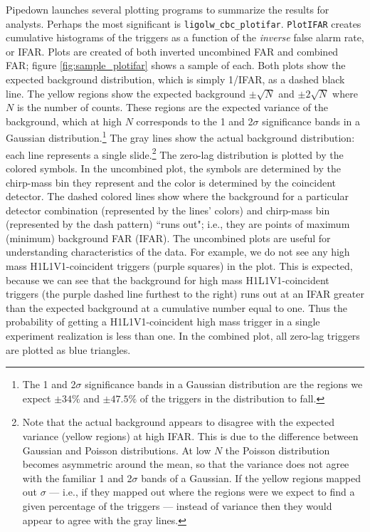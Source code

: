 Pipedown launches several plotting programs to summarize the results for
analysts. Perhaps the most significant is \verb|ligolw_cbc_plotifar|.
\texttt{PlotIFAR} creates cumulative histograms of the triggers as a function
of the \emph{inverse} false alarm rate, or IFAR. Plots are created of both
inverted uncombined \ac{FAR} and combined \ac{FAR}; figure
\ref{fig:sample_plotifar} shows a sample of each. Both plots show the expected
background distribution, which is simply 1/IFAR, as a dashed black line. The
yellow regions show the expected background $\pm \sqrt{N}$ and $\pm 2\sqrt{N}$
where $N$ is the number of counts. These regions are the expected variance of
the background, which at high $N$ corresponds to the 1 and 2$\sigma$
significance bands in a Gaussian distribution.\footnote{The 1 and 2$\sigma$
significance bands in a Gaussian distribution are the regions we expect $\pm
34\%$ and $\pm 47.5\%$ of the triggers in the distribution to fall.} The gray
lines show the actual background distribution: each line represents a single
slide.\footnote{Note that the actual background appears to disagree with the
expected variance (yellow regions) at high IFAR. This is due to the difference
between Gaussian and Poisson distributions. At low $N$ the Poisson distribution
becomes asymmetric around the mean, so that the variance does not agree with
the familiar 1 and 2$\sigma$ bands of a Gaussian. If the yellow regions mapped
out $\sigma$ --- i.e., if they mapped out where the regions were we expect to
find a given percentage of the triggers --- instead of variance then they would
appear to agree with the gray lines.} The zero-lag distribution is plotted by
the colored symbols. In the uncombined plot, the symbols are determined by the
chirp-mass bin they represent and the color is determined by the coincident
detector. The dashed colored lines show where the background for a particular
detector combination (represented by the lines' colors) and chirp-mass bin
(represented by the dash pattern) ``runs out"; i.e., they are points of maximum
(minimum) background \ac{FAR} (IFAR). The uncombined plots are useful for
understanding characteristics of the data. For example, we do not see any high
mass H1L1V1-coincident triggers (purple squares) in the plot. This is expected,
because we can see that the background for high mass H1L1V1-coincident triggers
(the purple dashed line furthest to the right) runs out at an IFAR greater than
the expected background at a cumulative number equal to one. Thus the
probability of getting a H1L1V1-coincident high mass trigger in a single
experiment realization is less than one. In the combined plot, all zero-lag
triggers are plotted as blue triangles.

